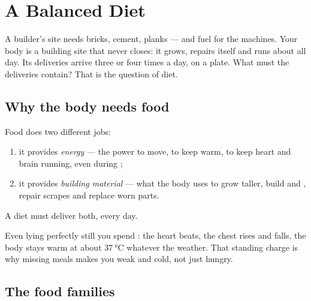 \chapter{A Balanced Diet}\label{ch:g3:balanced-diet}

A builder's site needs bricks, cement, planks --- and fuel for
the machines. Your body is a building site that never closes:
it grows, repairs itself and runs about all day. Its deliveries
arrive three or four times a day, on a plate. What must the
deliveries contain? That is the question of diet.

\section{Why the body needs food}

\begin{proposition}\label{prop:g3:balanced-diet:jobs}
Food does two different jobs:
\begin{enumerate}
  \item it provides \emph{energy} ---
        the power to move, to keep warm, to keep heart and brain
        running, even during ;
  \item it provides \emph{building material} --- what the body
        uses to grow taller, build  and , repair
        scrapes and replace worn parts.
\end{enumerate}
A diet must deliver both, every day.
\end{proposition}
\admitted

\begin{example}\label{ex:g3:balanced-diet:rest}
Even lying perfectly still you spend : the heart beats,
the chest rises and falls, the body stays warm at about
$\qty{37}{\degreeCelsius}$ whatever the weather. That standing
charge is why missing meals makes you weak and cold, not just
hungry.
\end{example}

\section{The food families}

